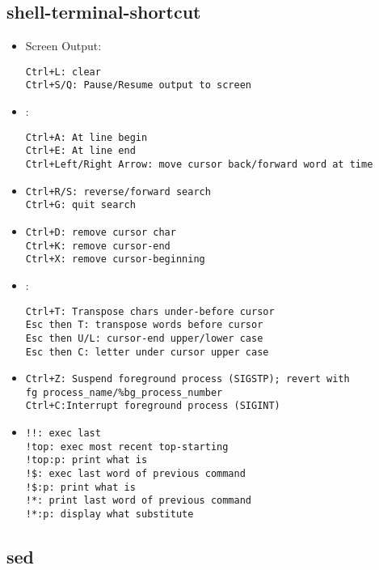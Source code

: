 \subsection{shell-terminal-shortcut}
\begin{itemize}
\item Screen Output:
\begin{lstlisting}
Ctrl+L: clear
Ctrl+S/Q: Pause/Resume output to screen
\end{lstlisting}
\item {}:
\begin{lstlisting}
Ctrl+A: At line begin
Ctrl+E: At line end
Ctrl+Left/Right Arrow: move cursor back/forward word at time
\end{lstlisting}
\item {}
\begin{lstlisting}
Ctrl+R/S: reverse/forward search
Ctrl+G: quit search
\end{lstlisting}
\item {}
\begin{lstlisting}
Ctrl+D: remove cursor char
Ctrl+K: remove cursor-end
Ctrl+X: remove cursor-beginning
\end{lstlisting}
\item {}:
\begin{lstlisting}
Ctrl+T: Transpose chars under-before cursor
Esc then T: transpose words before cursor
Esc then U/L: cursor-end upper/lower case
Esc then C: letter under cursor upper case
\end{lstlisting}
\item {}
\begin{lstlisting}
Ctrl+Z: Suspend foreground process (SIGSTP); revert with
fg process_name/%bg_process_number
Ctrl+C:Interrupt foreground process (SIGINT)
\end{lstlisting}
\item {}
\begin{lstlisting}
!!: exec last
!top: exec most recent top-starting
!top:p: print what is
!$: exec last word of previous command
!$:p: print what is
!*: print last word of previous command
!*:p: display what substitute
\end{lstlisting}
\end{itemize}

\subsection{sed}

